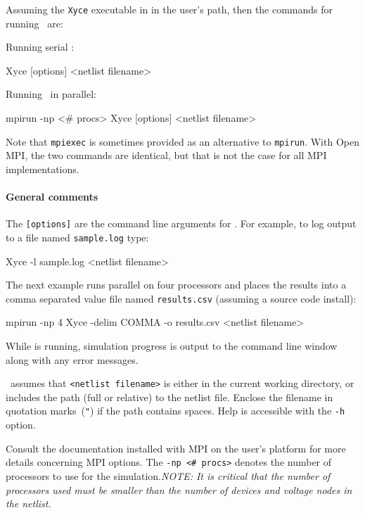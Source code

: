 Assuming the \texttt{Xyce} executable in in the user's path, then the
commands for running \Xyce\ are:
\begin{XyceItemize}
\item Running serial \Xyce:
\begin{vquote}
  Xyce [options] <netlist filename>
\end{vquote}
\item Running \Xyce\ in parallel:
\begin{vquote}
  mpirun -np <# procs> Xyce [options] <netlist filename>
\end{vquote}
\end{XyceItemize}
Note that \texttt{mpiexec} is sometimes provided as an alternative to
\texttt{mpirun}. With Open MPI, the two commands are identical, but
that is not the case for all MPI implementations.

\paragraph{General comments}
The \texttt{[options]} are the command line arguments for \Xyce{}.  For example,
to log output to a file named \texttt{sample.log} type:
\begin{vquote}
  Xyce -l sample.log <netlist filename>
\end{vquote}

The next example runs parallel \Xyce{} on four processors and places
the results into a comma separated value file named \texttt{results.csv}
(assuming a source code install):
\begin{vquote}
  mpirun -np 4 Xyce -delim COMMA -o results.csv <netlist filename>
\end{vquote}

While \Xyce{} is running, simulation progress is output to the
command line window along with any error
messages.  

\Xyce\ assumes that \texttt{<netlist filename>} is either in
the current working directory, or includes the path (full or relative)
to the netlist file.  Enclose the filename in quotation
marks~(\texttt{"}) if the path contains spaces.  Help is accessible with
the \texttt{-h} option.

Consult the documentation installed with MPI on the user's platform for more
details concerning MPI options.  The \texttt{-np <\# procs>} denotes the number
of processors to use for the
simulation.\newline \emph{NOTE: It is critical that the number of processors
used must be smaller than the number of devices and voltage nodes in the
netlist.}

